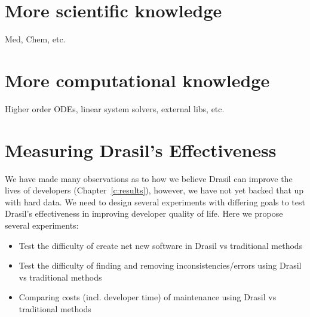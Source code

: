 \section{More scientific knowledge}

Med, Chem, etc.

\section{More computational knowledge}

Higher order ODEs, linear system solvers, external libs, etc.


\section{Measuring Drasil's Effectiveness}

We have made many observations as to how we believe Drasil can improve the 
lives of developers (Chapter~\ref{c:results}), however, we have not yet backed 
that up with hard data. We need to design several experiments with differing 
goals to test Drasil's effectiveness in improving developer quality of life. 
Here we propose several experiments:

\begin{itemize}
\item Test the difficulty of create net new software in Drasil vs traditional 
methods
\item Test the difficulty of finding and removing inconsistencies/errors using 
Drasil vs traditional methods
\item Comparing costs (incl. developer time) of maintenance using Drasil vs 
traditional methods
\end{itemize}


